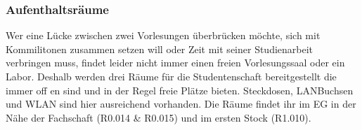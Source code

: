 \subsubsection{Aufenthaltsräume}
Wer eine Lücke zwischen zwei Vorlesungen 
überbrücken möchte, sich mit Kommilitonen 
zusammen setzen will oder Zeit mit seiner 
Studienarbeit verbringen muss, findet leider nicht 
immer einen freien Vorlesungssaal oder ein Labor. 
Deshalb werden drei Räume für die Studentenschaft bereitgestellt die 
immer off en sind und in der Regel freie Plätze bieten. Steckdosen, LANBuchsen und WLAN sind hier ausreichend vorhanden. Die Räume findet 
ihr im EG in der Nähe der Fachschaft (R0.014 & R0.015) und im ersten 
Stock (R1.010). 
